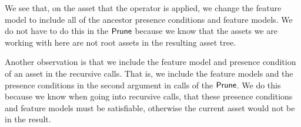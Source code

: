 \begin{center}
\end{center}

We see that, on the asset that the operator is applied, we change the feature
model to include all of the ancestor presence conditions and feature models.
We do not have to do this in the \({\sf Prune}\) because we know that
the assets we are working with here are not root assets in the resulting asset
tree.

Another observation is that we include the feature model and presence
condition of an asset in the recursive calls. That is, we include the
feature models and the presence conditions in the second argument in calls of
the \({\sf Prune}\). We do this because we know when going into
recursive calls, that these presence conditions and feature models must be
satisfiable, otherwise the current asset would not be in the result.

